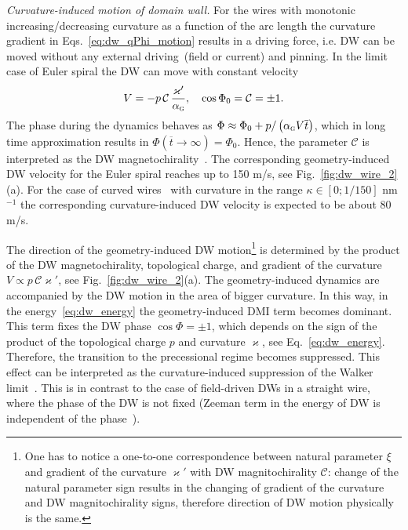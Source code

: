 {\it Curvature-induced motion of domain wall.} For the wires with monotonic increasing/decreasing curvature as a function of the arc length the curvature gradient in Eqs.~\eqref{eq:dw_qPhi_motion} results in a driving force, i.e. DW can be moved without any external driving~(field or current) and pinning. In the limit case of Euler spiral the DW can move with constant velocity
\begin{equation}\label{eq:velocity_euler_spiral}
V=-p\,\mathcal{C}\,\frac{\varkappa'}{\alpha_\textsc{g}},\quad\cos\Phi_0=\mathcal{C}=\pm1.
\end{equation}
The phase during the dynamics behaves as $\Phi\approx\Phi_0+p/\left(\alpha_\textsc{g} V \overline{t}\right)$, which in long time approximation results in $\Phi\left(\overline{t}\to\infty\right)=\Phi_0$. Hence, the parameter $\mathcal{C}$ is interpreted as the DW magnetochirality~\cite{Kim14}.  The corresponding geometry-induced DW velocity for the Euler spiral reaches up to 150 m/s, see Fig.~\ref{fig:dw_wire_2}(a). For the case of curved wires~\cite{Lewis09,Nahrwold09,Wartelle18} with curvature in the range $\kappa\in\left[0;1/150\right]$ nm$^{-1}$ the corresponding curvature-induced DW velocity is expected to be about 80 m/s.

The direction of the geometry-induced DW motion\footnote{One has to notice a one-to-one correspondence between natural	parameter $\xi$ and gradient of the curvature $\varkappa'$ with DW magnitochirality $\mathcal{C}$: change of the natural parameter sign results in the changing of gradient of the curvature and DW magnitochirality	signs, therefore direction of DW motion physically is the same.} is determined by the product of the DW magnetochirality, topological charge, and gradient of the curvature $V\propto p\,\mathcal{C}\varkappa'$, see Fig.~\ref{fig:dw_wire_2}(a). The geometry-induced dynamics are accompanied by the DW motion in the area of bigger curvature. In this way, in the energy~\eqref{eq:dw_energy} the geometry-induced DMI term becomes dominant. This term fixes the DW phase $\cos\Phi=\pm1$, which depends on the sign of the product of the topological charge $p$ and curvature $\varkappa$, see Eq.~\eqref{eq:dw_energy}. Therefore, the transition to the precessional regime becomes suppressed. This effect can be interpreted as the curvature-induced suppression of the Walker limit~\cite{Yershov18a}. This is in contrast to the case of field-driven DWs in a straight wire, where the phase of the DW is not fixed (Zeeman term in the energy of DW is independent of the phase~\cite{Malozemoff79,Hillebrands06}).

